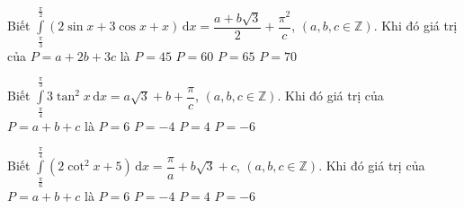 \begin{ex}%
	Biết $\displaystyle\int\limits_{\tfrac{\pi}{3}}^{\tfrac{\pi}{2}}{\left(2\sin x+3\cos x+x\right)\mathrm{\,d}x}=\dfrac{a+b\sqrt{3}}{2}+\dfrac{\pi^2}{c}$, $\left(a,b,c\in\mathbb{Z}\right)$. Khi đó giá trị của $ P=a+2b+3c$ là
	\choice
	{$ P=45$}
	{\True $ P=60$}
	{$ P=65$}
	{$ P=70$}
\end{ex}

\begin{ex}%
	Biết $\displaystyle\int\limits_{\tfrac{\pi}{4}}^{\tfrac{\pi}{3}}{3\tan^2x\mathrm{\,d}x}=a\sqrt{3}+b+\dfrac{\pi}{c}$, $\left(a,b,c\in\mathbb{Z}\right)$. Khi đó giá trị của $ P=a+b+c$ là
	\choice
	{$ P=6$}
	{\True $ P=-4$}
	{$ P=4$}
	{$ P=-6$}
\end{ex}
%
\begin{ex}%
	Biết $\displaystyle\int\limits_{\tfrac{\pi}{6}}^{\tfrac{\pi}{4}}{\left(2\cot^2x+5\right)\mathrm{\,d}x}=\dfrac{\pi}{a}+b\sqrt{3}+c$, $\left(a,b,c\in\mathbb{Z}\right)$. Khi đó giá trị của  $ P=a+b+c$ là
	\choice
	{$ P=6$}
	{$ P=-4$}
	{\True $ P=4$}
	{$ P=-6$}
\end{ex}

